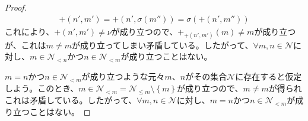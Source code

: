 \documentclass[dvipdfmx]{jsarticle}
\begin{document}
\begin{proof}
\begin{align*}
+ \left( n',m' \right) = + \left( n',\sigma\left( m'' \right) \right) = \sigma\left( + \left( n',m'' \right) \right)
\end{align*}
これにより、$+ \left( n',m' \right) \neq \nu$が成り立つので、$+_{+ \left( n',m' \right)}(m) \neq m$が成り立つが、これは$m \neq m$が成り立ってしまい矛盾している。したがって、$\forall m,n \in \mathcal{N}$に対し、$m \in \mathcal{N}_{< n}$かつ$n \in \mathcal{N}_{< m}$が成り立つことはない。\par
$m = n$かつ$n \in \mathcal{N}_{< m}$が成り立つような元々$m$、$n$がその集合$\mathcal{N}$に存在すると仮定しよう。このとき、$m \in \mathcal{N}_{< m} = \mathcal{N}_{\leq m} \setminus \left\{ m \right\}$が成り立つので、$m \neq m$が得られこれは矛盾している。したがって、$\forall m,n \in \mathcal{N}$に対し、$m = n$かつ$n \in \mathcal{N}_{< m}$が成り立つことはない。
\end{proof}
\end{document}
